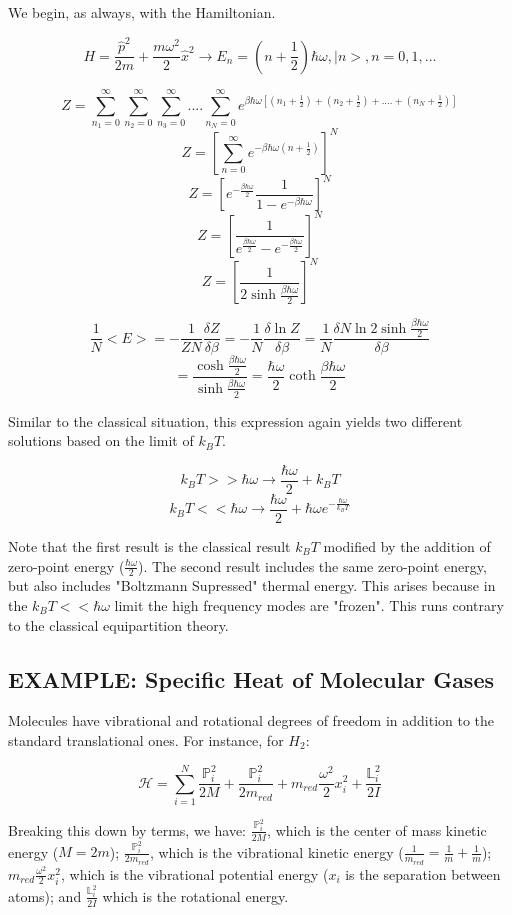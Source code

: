 \documentclass{article}
\newcommand{\pardif}[2]{\frac{\delta#1}{\delta#2}}
\newcommand{\bltz}{k_{B}}
\newcommand{\sumser}[2]{\sum\limits_{#1}^{#2}}
\begin{document}
We begin, as always, with the Hamiltonian.

$$H=\frac{\hat{p}^{2}}{2m}+\frac{m\omega^{2}}{2}\hat{x}^{2}\rightarrow E_{n}=(n+\frac{1}{2})\hbar\omega,|n>, n=0,1,...$$

$$Z=\sum_{n_{1}=0}^{\infty}\sum_{n_{2}=0}^{\infty}\sum_{n_{3}=0}^{\infty}....\sum_{n_{N}=0}^{\infty}e^{\beta\hbar\omega[(n_{1}+\frac{1}{2})+(n_{2}+\frac{1}{2})+....+(n_{N}+\frac{1}{2})]}$$
$$Z=[\sum_{n=0}^{\infty}e^{-\beta\hbar\omega(n+\frac{1}{2})}]^{N}$$
$$Z=[e^{-\frac{\beta\hbar\omega}{2}}\frac{1}{1-e^{-\beta\hbar\omega}}]^{N}$$
$$Z=[\frac{1}{e^{\frac{\beta\hbar\omega}{2}}-e^{-\frac{\beta\hbar\omega}{2}}}]^{N}$$
$$Z=[\frac{1}{2\sinh{\frac{\beta\hbar\omega}{2}}}]^{N}$$

$$\frac{1}{N}<E>=-\frac{1}{ZN}\pardif{Z}{\beta}=-\frac{1}{N}\pardif{\ln{Z}}{\beta}=\frac{1}{N}\pardif{N\ln{2\sinh{\frac{\beta\hbar\omega}{2}}}}{\beta}$$
$$=\frac{\cosh{\frac{\beta\hbar\omega}{2}}}{\sinh{\frac{\beta\hbar\omega}{2}}}=\frac{\hbar\omega}{2}\coth{\frac{\beta\hbar\omega}{2}}$$

Similar to the classical situation, this expression again yields two different solutions based on the limit of $\bltz T$.  

$$\bltz T>>\hbar\omega \rightarrow \frac{\hbar\omega}{2}+\bltz T$$
$$\bltz T<<\hbar\omega \rightarrow \frac{\hbar\omega}{2}+\hbar\omega e^{-\frac{\hbar\omega}{\bltz T}}$$

Note that the first result is the classical result $\bltz T$ modified by the addition of zero-point energy ($\frac{\hbar\omega}{2}$).  The second result includes the same zero-point energy, but also includes "Boltzmann Supressed" thermal energy.  This arises because in the $\bltz T<<\hbar\omega$ limit the high frequency modes are "frozen".  This runs contrary to the classical equipartition theory.

\subsection{EXAMPLE: Specific Heat of Molecular Gases}

Molecules have vibrational and rotational degrees of freedom in addition to the standard translational ones.  For instance, for $H_{2}$:

$$\mathcal{H}=\sumser{i=1}{N}\frac{\mathbb{P}_{i}^{2}}{2M}+\frac{\mathbb{P}_{i}^{2}}{2m_{red}}+m_{red}\frac{\omega^{2}}{2}x_{i}^{2}+\frac{\mathbb{L}_{i}^{2}}{2I}$$

Breaking this down by terms, we have: $\frac{\mathbb{P}_{i}^{2}}{2M}$, which is the center of mass kinetic energy ($M=2m$); $\frac{\mathbb{P}_{i}^{2}}{2m_{red}}$, which is the vibrational kinetic energy ($\frac{1}{m_{red}}=\frac{1}{m}+\frac{1}{m}$); $m_{red}\frac{\omega^{2}}{2}x_{i}^{2}$, which is the vibrational potential energy ($x_{i}$ is the separation between atoms); and $\frac{\mathbb{L}_{i}^{2}}{2I}$ which is the rotational energy.
\end{document}
